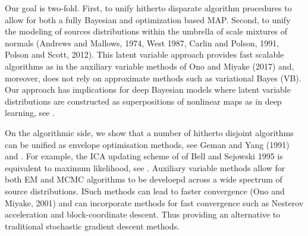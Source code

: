 \documentclass[11pt]{article}%
\begin{document}
Our goal is two-fold. First, to unify hitherto disparate algorithm  procedures to allow for both a fully Bayesian and optimization based MAP. Second, to unify the modeling of sources distributions within the umbrella of scale mixtures of normals (Andrews and Mallows, 1974, West 1987, Carlin and Polson, 1991, Polson and Scott, 2012). This latent variable approach provides 
fast scalable algorithms as in the auxiliary variable  methods of Ono and Miyake (2017) and, moreover, does not rely on approximate methods such as variational Bayes (VB). 
Our approach  has implications for deep Bayesian models where latent variable distributions are constructed as  superpositions of nonlinear maps as in  deep learning, see \citep{polson2017deep}.

On the algorithmic side, we show that a number of hitherto disjoint algorithms can be unified as envelope optimisation methods, see Geman and Yang (1991) and \citep{polson2015mixtures}. For example, the ICA updating scheme of  of Bell and Sejowski 1995 is equivalent to maximum likelihood, see \citep{mackay1992bayesian, mackay1996maximum}. Auxiliary variable methods allow for both EM and MCMC algorithms to be develoepd across a wide spectrum of source distributions. ISuch methods can lead to faster convergence (Ono and Miyake, 2001) and can incorporate methods for fast convergence such as Nesterov acceleration and block-coordinate descent. Thus providing an alternative to traditional stochastic gradient descent methods.
\end{document}
